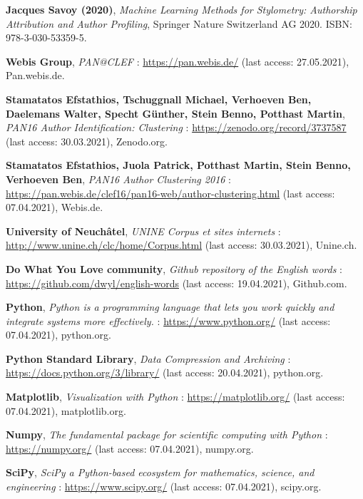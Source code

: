 \begin{thebibliography}{9}
\textbf{Jacques Savoy (2020)},
\textit{Machine Learning Methods for Stylometry: Authorship Attribution and Author Profiling},
Springer Nature Switzerland AG 2020. ISBN: 978-3-030-53359-5.


\textbf{Webis Group},
\textit{PAN@CLEF} : \url{https://pan.webis.de/} (last access: 27.05.2021),
Pan.webis.de.

\textbf{Stamatatos Efstathios, Tschuggnall Michael, Verhoeven Ben, Daelemans Walter, Specht Günther, Stein Benno, Potthast Martin},
\textit{PAN16 Author Identification: Clustering} : \url{https://zenodo.org/record/3737587} (last access: 30.03.2021),
Zenodo.org.

\textbf{Stamatatos Efstathios, Juola Patrick, Potthast Martin, Stein Benno, Verhoeven Ben},
\textit{PAN16 Author Clustering 2016} : \url{https://pan.webis.de/clef16/pan16-web/author-clustering.html} (last access: 07.04.2021),
Webis.de.

\textbf{University of Neuchâtel},
\textit{UNINE Corpus et sites internets} : \url{http://www.unine.ch/clc/home/Corpus.html} (last access: 30.03.2021),
Unine.ch.

\textbf{Do What You Love community},
\textit{Github repository of the English words} : \url{https://github.com/dwyl/english-words} (last access: 19.04.2021),
Github.com.


\textbf{Python},
\textit{Python is a programming language that lets you work quickly and integrate systems more effectively.} : \url{https://www.python.org/} (last access: 07.04.2021),
python.org.

\textbf{Python Standard Library},
\textit{Data Compression and Archiving} : \url{https://docs.python.org/3/library/} (last access: 20.04.2021),
python.org.

\textbf{Matplotlib},
\textit{Visualization with Python} : \url{https://matplotlib.org/} (last access: 07.04.2021),
matplotlib.org.

\textbf{Numpy},
\textit{The fundamental package for scientific computing with Python} : \url{https://numpy.org/} (last access: 07.04.2021),
numpy.org.

\textbf{SciPy},
\textit{SciPy a Python-based ecosystem for mathematics, science, and engineering} : \url{https://www.scipy.org/} (last access: 07.04.2021),
scipy.org.


\end{thebibliography}
